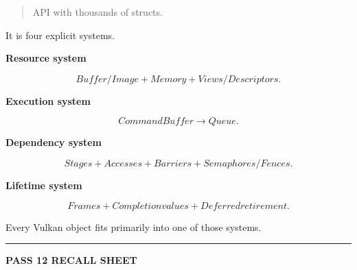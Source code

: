 \begin{quote}
API with thousands of structs.
\end{quote}

It is four explicit systems.

\textbf{Resource system}

\[
Buffer/Image
+
Memory
+
Views/Descriptors.
\]

\textbf{Execution system}

\[
CommandBuffer
\rightarrow
Queue.
\]

\textbf{Dependency system}

\[
Stages
+
Accesses
+
Barriers
+
Semaphores/Fences.
\]

\textbf{Lifetime system}

\[
Frames
+
Completion values
+
Deferred retirement.
\]

Every Vulkan object fits primarily into one of those systems.

\begin{center}\rule{0.5\linewidth}{0.5pt}\end{center}

\textbf{PASS 12 RECALL SHEET}

